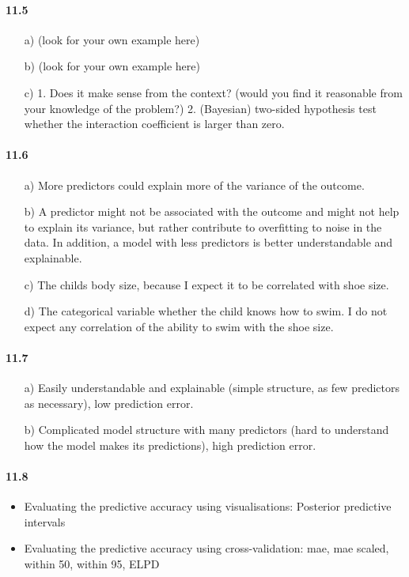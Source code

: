 \documentclass[fontsize=11pt,DIV=18,parskip=half]{scrartcl}
\begin{document}
\paragraph{11.5}
\begin{itemize}
\item[a)] (look for your own example here)
\item[b)] (look for your own example here)
\item[c)] 1. Does it make sense from the context? (would you find it reasonable from your knowledge of the problem?) 2. (Bayesian) two-sided hypothesis test whether the interaction coefficient is larger than zero. 
\end{itemize}

\paragraph{11.6}
\begin{itemize}
\item[a)] More predictors could explain more of the variance of the outcome.
\item[b)] A predictor might not be associated with the outcome and might not help to explain its variance, but rather contribute to overfitting to noise in the data. In addition, a model with less predictors is better understandable and explainable.
\item[c)] The childs body size, because I expect it to be correlated with shoe size.
\item[d)] The categorical variable whether the child knows how to swim. I do not expect any correlation of the ability to swim with the shoe size.
\end{itemize}

\paragraph{11.7}
\begin{itemize}
\item[a)] Easily understandable and explainable (simple structure, as few predictors as necessary), low prediction error.
\item[b)] Complicated model structure with many predictors (hard to understand how the model makes its predictions), high prediction error.
\end{itemize}

\paragraph{11.8}
\begin{itemize}
\item Evaluating the predictive accuracy using visualisations: Posterior predictive intervals
\item Evaluating the predictive accuracy using cross-validation: mae, mae scaled, within 50, within 95, ELPD
\end{itemize}
\end{document}

